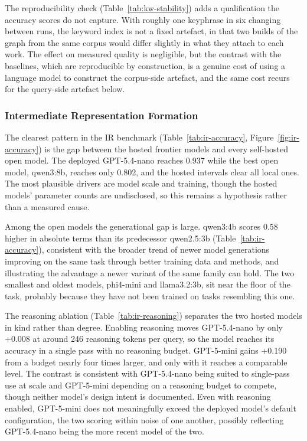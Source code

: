 The reproducibility check (Table~\ref{tab:kw-stability}) adds a qualification the accuracy scores do not capture. With roughly one keyphrase in six changing between runs, the keyword index is not a fixed artefact, in that two builds of the graph from the same corpus would differ slightly in what they attach to each work. The effect on measured quality is negligible, but the contrast with the baselines, which are reproducible by construction, is a genuine cost of using a language model to construct the corpus-side artefact, and the same cost recurs for the query-side artefact below.

\subsubsection{Intermediate Representation Formation}

The clearest pattern in the IR benchmark (Table~\ref{tab:ir-accuracy}, Figure~\ref{fig:ir-accuracy}) is the gap between the hosted frontier models and every self-hosted open model. The deployed GPT-5.4-nano reaches 0.937 while the best open model, qwen3:8b, reaches only 0.802, and the hosted intervals clear all local ones. The most plausible drivers are model scale and training, though the hosted models' parameter counts are undisclosed, so this remains a hypothesis rather than a measured cause.

Among the open models the generational gap is large. qwen3:4b scores 0.58 higher in absolute terms than its predecessor qwen2.5:3b (Table~\ref{tab:ir-accuracy}), consistent with the broader trend of newer model generations improving on the same task through better training data and methods, and illustrating the advantage a newer variant of the same family can hold. The two smallest and oldest models, phi4-mini and llama3.2:3b, sit near the floor of the task, probably because they have not been trained on tasks resembling this one.

The reasoning ablation (Table~\ref{tab:ir-reasoning}) separates the two hosted models in kind rather than degree. Enabling reasoning moves GPT-5.4-nano by only +0.008 at around 246 reasoning tokens per query, so the model reaches its accuracy in a single pass with no reasoning budget. GPT-5-mini gains +0.190 from a budget nearly four times larger, and only with it reaches a comparable level. The contrast is consistent with GPT-5.4-nano being suited to single-pass use at scale and GPT-5-mini depending on a reasoning budget to compete, though neither model's design intent is documented. Even with reasoning enabled, GPT-5-mini does not meaningfully exceed the deployed model's default configuration, the two scoring within noise of one another, possibly reflecting GPT-5.4-nano being the more recent model of the two.

